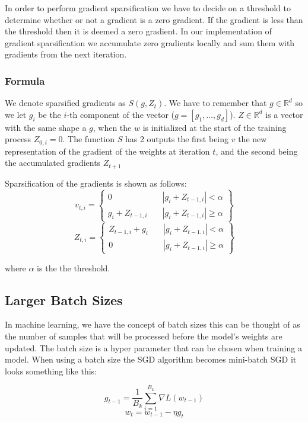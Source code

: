 \documentclass[twocolumn,10pt]{article}
\begin{document}
In order to perform gradient sparsification we have to decide on a threshold to determine whether or not a gradient is a zero gradient. If the gradient is less than the threshold then it is deemed a zero gradient. In our implementation of gradient sparsification we accumulate zero gradients locally and sum them with gradients from the next iteration. 

\subsubsection{Formula}
We denote sparsified gradients as $S(g, Z_t)$. We have to remember that $g \in \mathbb{R}^d$ so we let $g_i$ be the $i$-th component of the vector ($g=[g_1,\ldots,g_d]$). $Z \in \mathbb{R}^d$ is a vector with the same shape a $g$, when the $w$ is initialized at the start of the training process $Z_{0,i} = 0$. The function $S$ has 2 outputs the first being $v$ the new representation of the gradient of the weights at iteration $t$, and the second being the accumulated gradients $Z_{t+1}$

Sparsification of the gradients is shown as follows: 
$$
v_{t,i} =
\left\{
	\begin{array}{cc}
		0 & \quad \left| g_i + Z_{t-1,i}\right| < \alpha \\
		g_i + Z_{t-1,i} & \quad \left| g_i + Z_{t-1,i}\right| \geq \alpha
	\end{array}
\right\}
$$
$$
Z_{t,i} =
\left\{
	\begin{array}{cc}
		Z_{t-1,i} + g_i & \quad \left| g_i + Z_{t-1,i}\right| < \alpha \\
		0	& \quad \left| g_i + Z_{t-1,i}\right| \geq \alpha
	\end{array}
\right\}
$$

where $\alpha$ is the the threshold.


\subsection{Larger Batch Sizes}
In machine learning, we have the concept of batch sizes this can be thought of as the number of samples that will be processed before the model's weights are updated. The batch size is a hyper parameter that can be chosen when training a model. When using a batch size the SGD algorithm becomes mini-batch SGD it looks something like this:

$$
g_{t-1} = \frac{1}{B_k} \sum_{i=1}^{B_k} {\nabla} L(w_{t-1})
$$
$$
w_{t} = w_{t-1} - \eta g_{t}
$$ 
\end{document}
